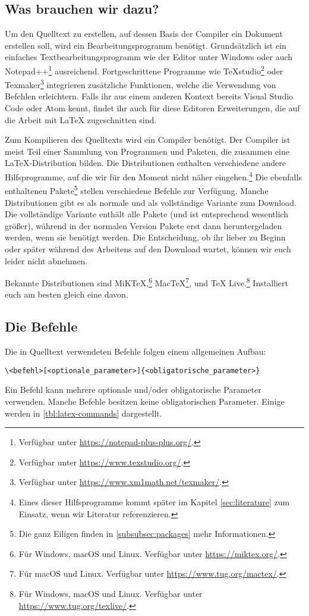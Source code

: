 \subsection{Was brauchen wir dazu?}
\label{subsec:what-we-need}
Um den Quelltext zu erstellen, auf dessen Basis der Compiler ein Dokument erstellen soll, wird ein Bearbeitungsprogramm benötigt.
Grundsätzlich ist ein einfaches Textbearbeitungsprogramm wie der Editor unter Windows oder auch Notepad++\footnote{Verfügbar unter \url{https://notepad-plus-plus.org/}.} ausreichend.
Fortgeschrittene Programme wie TeXstudio\footnote{Verfügbar unter \url{https://www.texstudio.org/}.} oder Texmaker\footnote{Verfügbar unter \url{https://www.xm1math.net/texmaker/}.} integrieren zusätzliche Funktionen, welche die Verwendung von Befehlen erleichtern.
Falls ihr aus einem anderen Kontext bereits Visual Studio Code oder Atom kennt, findet ihr auch für diese Editoren Erweiterungen, die auf die Arbeit mit \LaTeX{} zugeschnitten sind.

Zum Kompilieren des Quelltexts wird ein Compiler benötigt.
Der Compiler ist meist Teil einer Sammlung von Programmen und Paketen, die zusammen eine \LaTeX-Distribution bilden.
Die Distributionen enthalten verschiedene andere Hilfsprogramme, auf die wir für den Moment nicht näher eingehen.\footnote{Eines dieser Hilfsprogramme kommt später im Kapitel \ref{sec:literature} zum Einsatz, wenn wir Literatur referenzieren.}
Die ebenfalls enthaltenen Pakete\footnote{Die ganz Eiligen finden in \cref{subsubsec:packages} mehr Informationen.} stellen verschiedene Befehle zur Verfügung.
Manche Distributionen gibt es als normale und als vollständige Variante zum Download. 
Die vollständige Variante enthält alle Pakete (und ist entsprechend wesentlich größer), während in der normalen Version Pakete erst dann heruntergeladen werden, wenn sie benötigt werden.
Die Entscheidung, ob ihr lieber zu Beginn oder später während des Arbeitens auf den Download wartet, können wir euch leider nicht abnehmen.

Bekannte Distributionen sind MiK\TeX,\footnote{Für Windows, macOS und Linux. Verfügbar unter \url{https://miktex.org/}.} Mac\TeX\footnote{Für macOS und Linux. Verfügbar unter \url{https://www.tug.org/mactex/}.}, und \TeX{} Live.\footnote{Für Windows, macOS und Linux. Verfügbar unter \url{https://www.tug.org/texlive/}.}
Installiert euch am besten gleich eine davon.

\subsection{Die Befehle}
\label{subsec:command-structure}
Die in Quelltext verwendeten Befehle folgen einem allgemeinen Aufbau:
\begin{verbatim}
\<befehl>[<optionale_parameter>]{<obligatorische_parameter>}
\end{verbatim}
Ein Befehl kann mehrere optionale und/oder obligatorische Parameter verwenden. Manche Befehle besitzen keine obligatorischen Parameter. Einige werden in \cref{tbl:latex-commands} dargestellt.

